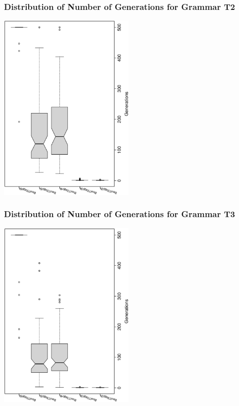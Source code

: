 \documentclass[18pt,c]{beamer}
\begin{document}
 \begin{frame}
 \frametitle{ Distribution of Number of Generations for Grammar T2 }
 \begin{center}
\includegraphics[width=0.5\textwidth, angle=-90]
{ExpBboxplottGenerations007.eps}
 \end{center}
 \label{ExpBboxplottGenerations007.eps}  
 \end{frame}

 \begin{frame}
 \frametitle{ Distribution of Number of Generations for Grammar T3 }
 \begin{center}
\includegraphics[width=0.5\textwidth, angle=-90]
{ExpBboxplottGenerations008.eps}
 \end{center}
 \label{ExpBboxplottGenerations008.eps}  
 \end{frame}
\end{document}
